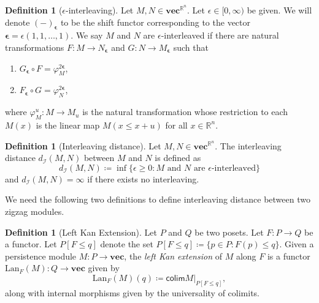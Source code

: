 \documentclass{article}
\newcommand{\RR}{\mathbb{R}}
\renewcommand{\varinjlim}{\mathsf{colim}}
\theoremstyle{plain}
\theoremstyle{definition}
\newtheorem{definition}[theorem]{Definition}
\theoremstyle{remark}
\begin{document}
\begin{definition}[$\epsilon$-interleaving]
    Let $M, N \in \mathbf{vec}^{\RR^n}$. Let $\epsilon \in [0,\infty)$ be given. We will denote $(-)_{\bm{\epsilon}}$ to be the shift functor corresponding to the vector $\bm{\epsilon} = \epsilon(1,1,\hdots,1)$. We say $M$ and $N$ are $\epsilon$-interleaved if there are natural transformations $F \colon M \to N_{\bm{\epsilon}}$ and $G \colon N \to M_{\bm{\epsilon}}$ such that 
    \begin{enumerate}
        \item $G_{\bm{\epsilon}} \circ F = \varphi_M^{2\bm{\epsilon}} $,
        \item $F_{\bm{\epsilon}} \circ G = \varphi_N^{2\bm{\epsilon}}$,
    \end{enumerate}
    where $\varphi_M^u \colon M \to M_u$ is the natural transformation whose restriction to each $M(x)$ is the linear map $M(x \leq x+ u)$ for all $x \in \RR^n$.
\end{definition}

\begin{definition}[Interleaving distance]
    Let $M, N \in \mathbf{vec}^{\RR^n}$. The interleaving distance $d_\mathcal{I}(M,N)$ between $M$ and $N$ is defined as
    \begin{equation*}
        d_\mathcal{I}(M,N) \coloneqq \inf \{\epsilon \geq 0 \colon M \text{ and } N \text{ are } \epsilon\text{-interleaved} \}
    \end{equation*}
    and $d_\mathcal{I}(M,N) = \infty$ if there exists no interleaving.
    \label{def:interleaving}
\end{definition}

We need the following two definitions to define interleaving distance between two zigzag modules. 

\begin{definition}[Left Kan Extension]
    Let $P$ and $Q$ be two posets. Let $F \colon P \to Q$ be a functor. Let $P[F \leq q]$ denote the set $P[F \leq q] \coloneqq \{p \in P \colon F(p) \leq q \}$. Given a persistence module $M \colon P \to \mathbf{vec}$, the \emph{left Kan extension} of $M$ along $F$ is a functor $\text{Lan}_F(M) \colon Q \to \mathbf{vec}$ given by 
    \begin{equation*}
        \text{Lan}_F(M)(q) \coloneqq \varinjlim M|_{P[F \leq q]},
    \end{equation*}
    along with internal morphisms given by the universality of colimits.
\end{definition}
\end{document}
